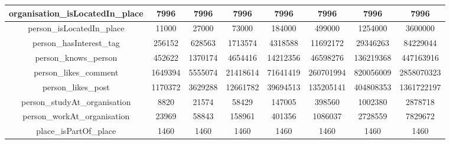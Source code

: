 \begin{table}[H]
{\begin{tabular} {| c | c | c | c | c | c | c | c |}
        \hline                                                                                                                      
        organisation\_isLocatedIn\_place& 7996          & 7996          & 7996     & 7996     & 7996 			& 7996 			& 7996 			 \\ 
        \hline                                                                                                                      
        person\_isLocatedIn\_place      & 11000         & 27000         & 73000    & 184000   & 499000 		& 1254000 	& 3600000 	 \\ 
        \hline                                                                                                                      
        person\_hasInterest\_tag        & 256152        & 628563        & 1713574  & 4318588  & 11692172 	& 29346263 	& 84229044 	 \\ 
        \hline                                                                                                                      
        person\_knows\_person           & 452622        & 1370174       & 4654416  & 14212356 & 46598276 	& 136219368 & 447163916  \\ 
        \hline                                                                                                                      
        person\_likes\_comment          & 1649394       & 5555074       & 21418614 & 71641419 & 260701994 & 820056009 & 2858070323 \\	
        \hline                                                                                                                      
        person\_likes\_post             & 1170372       & 3629288       & 12661782 & 39694513 & 135205141 & 404808353 & 1361722197 \\	
        \hline                                                                                                                      
        person\_studyAt\_organisation   & 8820          & 21574         & 58429    & 147005   & 398560 		& 1002380 	& 2878718 	 \\ 
        \hline                                                                                                                      
        person\_workAt\_organisation    & 23969         & 58843         & 158961   & 401356   & 1086037 	& 2728559 	& 7829672 	 \\ 
        \hline                                                                                                                      
        place\_isPartOf\_place          & 1460          & 1460          & 1460     & 1460     & 1460 			& 1460 			& 1460 			 \\ 

\end{tabular}}
\end{table}
